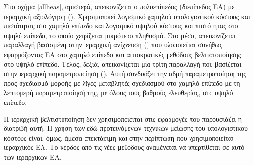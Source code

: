 Στο σχήμα \ref{allheas}, αριστερά, απεικονίζεται ο πολυεπίπεδος (διεπίπεδος ΕΑ) με ιεραρχική αξιολόγηση (). Χρησιμοποιεί λογισμικό χαμηλού υπολογιστικού κόστους και πιστότητας στο χαμηλό επίπεδο και λογισμικό υψηλού κόστους και πιστότητας στο υψηλό επίπεδο, το οποίο χειρίζεται μικρότερο πληθυσμό. Στο μέσο, απεικονίζεται παραλλαγή βασισμένη στην ιεραρχική ανίχνευση () που υλοποιείται συνήθως εφαρμόζοντας ΕΑ στο χαμηλό επίπεδο και αιτιοκρατικές μεθόδους βελτιστοποίησης στο υψηλό επίπεδο. Τέλος, δεξιά, απεικονίζεται μια τρίτη παραλλαγή που βασίζεται στην ιεραρχική παραμετροποίηση (). Αυτή συνδυάζει την αδρή παραμετροποίηση της προς σχεδιασμό μορφής με λίγες μεταβλητές σχεδιασμού στο χαμηλό επίπεδο με τη λεπτομερή παραμετροποίησή της, με όλους τους βαθμούς ελευθερίας, στο υψηλό επίπεδο.

Η ιεραρχική βελτιστοποίηση δεν χρησιμοποιείται στις εφαρμογές που παρουσιάζει η διατριβή αυτή. Η χρήση των εδώ προτεινόμενων τεχνικών μείωσης του υπολογιστικού κόστους είναι, όμως, άμεσα επεκτάσιμη και στην περίπτωση που χρησιμοποιείται ιεραρχικός ΕΑ. Το κέρδος από τις νέες μεθόδους αναμένεται να υπερτίθεται σε αυτό των ιεραρχικών ΕΑ.




